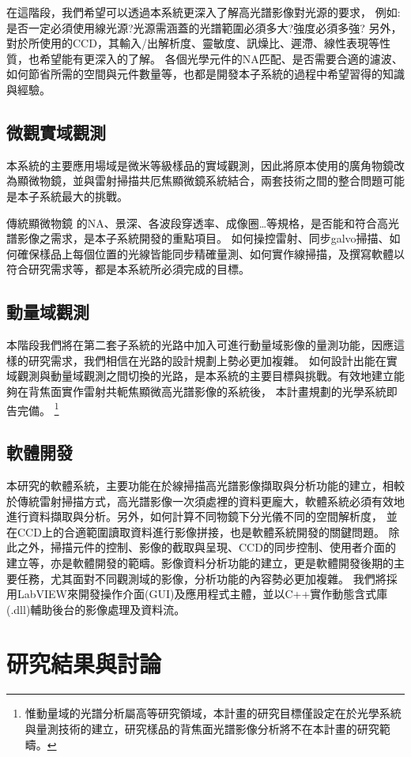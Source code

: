\documentclass[12pt]{article}
\begin{document}
在這階段，我們希望可以透過本系統更深入了解高光譜影像對光源的要求，
例如: 是否一定必須使用線光源?光源需涵蓋的光譜範圍必須多大?強度必須多強?
另外，對於所使用的CCD，其輸入/出解析度、靈敏度、訊燥比、遲滯、線性表現等性質，也希望能有更深入的了解。
各個光學元件的NA匹配、是否需要合適的濾波、如何節省所需的空間與元件數量等，也都是開發本子系統的過程中希望習得的知識與經驗。
\subsection{微觀實域觀測} \label{microreal}
本系統的主要應用場域是微米等級樣品的實域觀測，因此將原本使用的廣角物鏡改為顯微物鏡，並與雷射掃描共厄焦顯微鏡系統結合，兩套技術之間的整合問題可能是本子系統最大的挑戰。

傳統顯微物鏡
的NA、景深、各波段穿透率、成像圈\ldots 等規格，是否能和符合高光譜影像之需求，是本子系統開發的重點項目。
如何操控雷射、同步galvo掃描、如何確保樣品上每個位置的光線皆能同步精確量測、如何實作線掃描，及撰寫軟體以符合研究需求等，都是本系統所必須完成的目標。
\subsection{動量域觀測} \label{momentum}
本階段我們將在第二套子系統的光路中加入可進行動量域影像的量測功能，因應這樣的研究需求，我們相信在光路的設計規劃上勢必更加複雜。
如何設計出能在實域觀測與動量域觀測之間切換的光路，是本系統的主要目標與挑戰。有效地建立能夠在背焦面實作雷射共軛焦顯微高光譜影像的系統後，
本計畫規劃的光學系統即告完備。
\footnote{惟動量域的光譜分析屬高等研究領域，本計畫的研究目標僅設定在於光學系統與量測技術的建立，研究樣品的背焦面光譜影像分析將不在本計畫的研究範疇。}

\subsection{軟體開發} \label{software}
本研究的軟體系統，主要功能在於線掃描高光譜影像擷取與分析功能的建立，相較於傳統雷射掃描方式，高光譜影像一次須處裡的資料更龐大，軟體系統必須有效地進行資料擷取與分析。另外，如何計算不同物鏡下分光儀不同的空間解析度，
並在CCD上的合適範圍讀取資料進行影像拼接，也是軟體系統開發的關鍵問題。
除此之外，掃描元件的控制、影像的截取與呈現、CCD的同步控制、使用者介面的建立等，亦是軟體開發的範疇。影像資料分析功能的建立，更是軟體開發後期的主要任務，尤其面對不同觀測域的影像，分析功能的內容勢必更加複雜。
我們將採用LabVIEW來開發操作介面(GUI)及應用程式主體，並以C++實作動態含式庫(.dll)輔助後台的影像處理及資料流。

\section{研究結果與討論}
\end{document}
